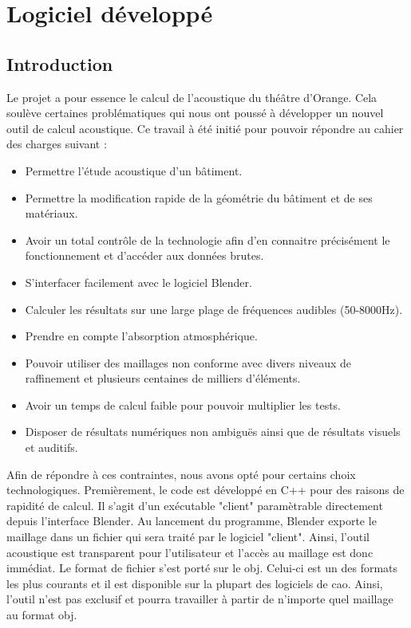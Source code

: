 











		
\chapter{Logiciel développé}
	\minitoc
	\newpage
	
\section{Introduction}
Le projet a pour essence le calcul de l'acoustique du théâtre d'Orange. Cela soulève certaines problématiques qui nous ont poussé à développer un nouvel outil de calcul acoustique. Ce travail à été initié pour pouvoir répondre au cahier des charges suivant :
\begin{itemize}
	\item Permettre l'étude acoustique d'un bâtiment.
	\item Permettre la modification rapide de la géométrie du bâtiment et de ses matériaux.
	\item Avoir un total contrôle de la technologie afin d'en connaitre précisément le fonctionnement et d'accéder aux données brutes.
	\item S'interfacer facilement avec le logiciel Blender.
	\item Calculer les résultats sur une large plage de fréquences audibles (50-8000Hz).
	\item Prendre en compte l'absorption atmosphérique.
	\item Pouvoir utiliser des maillages non conforme avec divers niveaux de raffinement et plusieurs centaines de milliers d'éléments.
	\item Avoir un temps de calcul faible pour pouvoir multiplier les tests.
	\item Disposer de résultats numériques non ambiguës ainsi que de résultats visuels et auditifs.
\end{itemize}

Afin de répondre à ces contraintes, nous avons opté pour certains choix technologiques. Premièrement, le code est développé en C++ pour des raisons de rapidité de calcul. Il s'agit d'un exécutable "client" paramètrable directement depuis l'interface Blender. Au lancement du programme, Blender exporte le maillage dans un fichier qui sera traité par le logiciel "client". Ainsi, l'outil acoustique est transparent pour l'utilisateur et l'accès au maillage est donc immédiat. Le format de fichier s'est porté sur le \gls{obj}. Celui-ci est un des formats les plus courants et il est disponible sur la plupart des logiciels de \gls{cao}. Ainsi, l'outil n'est pas exclusif et pourra travailler à partir de n'importe quel maillage au format \gls{obj}.

